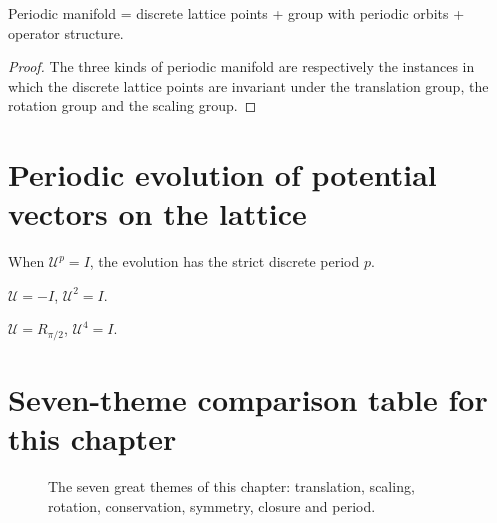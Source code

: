 \begin{theorem}\label{thm:three_periodic_manifolds_unity}
Periodic manifold = discrete lattice points + group with periodic orbits + operator structure.
\end{theorem}

\begin{proof}
The three kinds of periodic manifold are respectively the instances in which the discrete lattice points are invariant under the translation group, the rotation group and the scaling group.
\end{proof}

\section{Periodic evolution of potential vectors on the lattice}\label{sec:lattice_periodic_evolution}

\begin{definition}\label{def:lattice_periodic_evolution}
When $\mathcal{U}^p=I$, the evolution has the strict discrete period $p$.
\end{definition}

\begin{example}\label{ex:lattice_c2_period}
$\mathcal{U}=-I$, $\mathcal{U}^2=I$.
\end{example}

\begin{example}\label{ex:lattice_c4_period}
$\mathcal{U}=R_{\pi/2}$, $\mathcal{U}^4=I$.
\end{example}

\section*{Seven-theme comparison table for this chapter}

\begin{figure}[htbp]
\centering
{}
\caption{The seven great themes of this chapter: translation, scaling, rotation, conservation, symmetry, closure and period.}
\label{fig:periodic_manifold_themes}
\end{figure}

